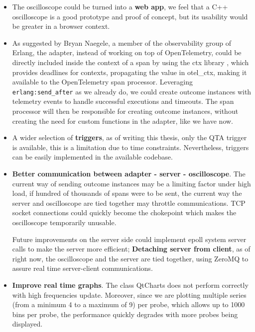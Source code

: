         \begin{itemize}
            \item The oscilloscope could be turned into a \textbf{web app}, we feel that a C++ oscilloscope is a good prototype and proof of concept, but its usability would be greater in a browser context.
            \item As suggested by Bryan Naegele, a member of the observability group of Erlang, the adapter, instead of working on top of OpenTelemetry, could be directly included inside the context of a span by using the ctx library \cite{ctx}, which provides deadlines for contexts, propagating the value in otel\_ctx, making it available to the OpenTelemetry span processor. Leveraging \texttt{erlang:send\_after} as we already do, we could create outcome instances with telemetry events to handle successful executions and timeouts. The span processor will then be responsible for creating outcome instances, without creating the need for custom functions in the adapter, like we have now.
            \item A wider selection of \textbf{triggers}, as of writing this thesis, only the QTA trigger is available, this is a limitation due to time constraints. Nevertheless, triggers can be easily implemented in the available codebase.
            \item \textbf{Better communication between adapter - server - oscilloscope}. The current way of sending outcome instances may be a limiting factor under high load, if hundred of thousands of spans were to be sent, the current way the server and oscilloscope are tied together may throttle communications. TCP socket connections could quickly become the chokepoint which makes the oscilloscope temporarily unusable.

            Future improvements on the server side could implement epoll system server calls to make the server more efficient; \textbf{Detaching server from client}, as of right now, the oscilloscope and the server are tied together, using ZeroMQ to assure real time server-client communications.
            \item \textbf{Improve real time graphs}. The class QtCharts does not perform correctly with high frequencies update. Moreover, since we are plotting multiple series (from a minimum 4 to a maximum of 9) per probe, which allows up to 1000 bins per probe, the performance quickly degrades with more probes being displayed.
        \end{itemize}
